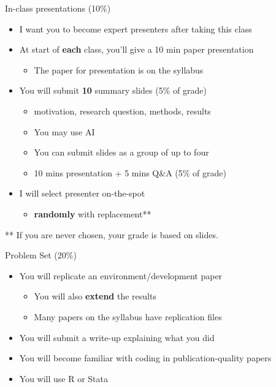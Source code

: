 \documentclass[
  ignorenonframetext,
  aspectratio=169]{beamer}
\providecommand{\tightlist}{%
  \setlength{\itemsep}{0pt}\setlength{\parskip}{0pt}}
\begin{document}
\begin{frame}{In-class presentations (10\%)}
\protect\hypertarget{in-class-presentations-10}{}
\begin{itemize}
\item
  I want you to become expert presenters after taking this class
\item
  At start of \textbf{each} class, you'll give a 10 min paper
  presentation

  \begin{itemize}
  \tightlist
  \item
    The paper for presentation is on the syllabus
  \end{itemize}
\item
  You will submit \textbf{10} summary slides (5\% of grade)

  \begin{itemize}
  \tightlist
  \item
    motivation, research question, methods, results
  \item
    You may use AI
  \item
    You can submit slides as a group of up to four
  \item
    10 mins presentation + 5 mins Q\&A (5\% of grade)
  \end{itemize}
\item
  I will select presenter on-the-spot

  \begin{itemize}
  \tightlist
  \item
    \textbf{randomly} with replacement**
  \end{itemize}
\end{itemize}

\vfill

** \footnotesize If you are never chosen, your grade is based on slides.
\end{frame}

\begin{frame}{Problem Set (20\%)}
\protect\hypertarget{problem-set-20}{}
\begin{itemize}
\item
  You will replicate an environment/development paper

  \begin{itemize}
  \tightlist
  \item
    You will also \textbf{extend} the results
  \item
    Many papers on the syllabus have replication files
  \end{itemize}
\item
  You will submit a write-up explaining what you did
\item
  You will become familiar with coding in publication-quality papers
\item
  You will use R or Stata
\end{itemize}
\end{frame}
\end{document}
